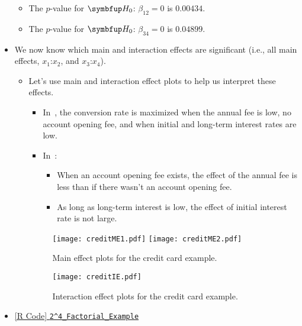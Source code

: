 \begin{itemize}
\begin{itemize}
                  \item The $ p $-value for $ \HN $: $ \beta_{12}=0 $ is $ 0.00434 $.
                  \item The $ p $-value for $ \HN $: $ \beta_{34}=0 $ is $ 0.04899 $.
            \end{itemize}
      \item We now know which main and interaction effects are significant (i.e., all main effects, $ x_1 $:$ x_2 $, and $ x_3 $:$ x_4 $).
            \begin{itemize}
                  \item Let's use main and interaction effect plots to help us interpret these effects.
                        \begin{itemize}
                              \item In~, the conversion rate is maximized when the annual fee is low, no account opening fee, and
                                    when initial and long-term interest rates are low.
                              \item In~:
                                    \begin{itemize}
                                          \item When an account opening fee exists, the effect of the annual fee is less than if there wasn't an account opening fee.
                                          \item As long as long-term interest is low, the effect of initial interest rate is not large.
                                    \end{itemize}
                        \end{itemize}
                        \begin{figure}[!htbp]
                              \centering
                              \texttt{[image: creditME1.pdf]}\hfill
                              \texttt{[image: creditME2.pdf]}
                              \caption{Main effect plots for the credit card example.}\label{fig:creditME}
                        \end{figure}
                        \begin{figure}[!htbp]
                              \centering
                              \texttt{[image: creditIE.pdf]}
                              \caption{Interaction effect plots for the credit card example.}\label{fig:creditIE}
                        \end{figure}
            \end{itemize}
      \item \href{https://github.com/Hextical/university-notes/blob/master/year-3/semester-3/STAT 430/code/W9/2^4_Factorial_Example.R}{[R Code] \texttt{2\^{}4\_Factorial\_Example}}
\end{itemize}
